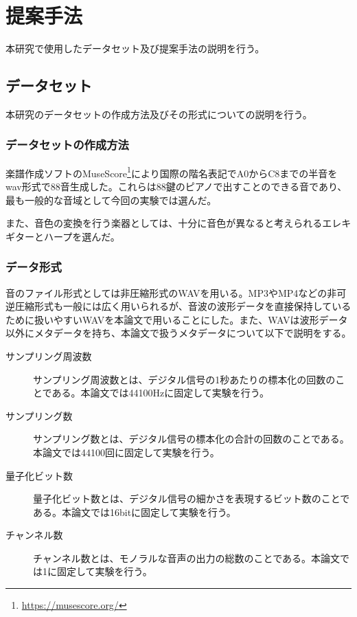 \chapter{提案手法}

本研究で使用したデータセット及び提案手法の説明を行う。

\section{データセット}

本研究のデータセットの作成方法及びその形式についての説明を行う。

\subsection{データセットの作成方法}

楽譜作成ソフトのMuseScore\footnote{\url{https://musescore.org/}}により国際の階名表記でA0からC8までの半音をwav形式で88音生成した。これらは88鍵のピアノで出すことのできる音であり、最も一般的な音域として今回の実験では選んだ。

また、音色の変換を行う楽器としては、十分に音色が異なると考えられるエレキギターとハープを選んだ。

\subsection{データ形式}

音のファイル形式としては非圧縮形式のWAVを用いる。MP3やMP4などの非可逆圧縮形式も一般には広く用いられるが、音波の波形データを直接保持しているために扱いやすいWAVを本論文で用いることにした。また、WAVは波形データ以外にメタデータを持ち、本論文で扱うメタデータについて以下で説明をする。

\begin{description}

\item[サンプリング周波数]\mbox{}

サンプリング周波数とは、デジタル信号の1秒あたりの標本化の回数のことである。本論文では44100Hzに固定して実験を行う。

\item[サンプリング数]\mbox{}

サンプリング数とは、デジタル信号の標本化の合計の回数のことである。本論文では44100回に固定して実験を行う。

\item[量子化ビット数]\mbox{}

量子化ビット数とは、デジタル信号の細かさを表現するビット数のことである。本論文では16bitに固定して実験を行う。

\item[チャンネル数]\mbox{}

チャンネル数とは、モノラルな音声の出力の総数のことである。本論文では1に固定して実験を行う。

\end{description}

